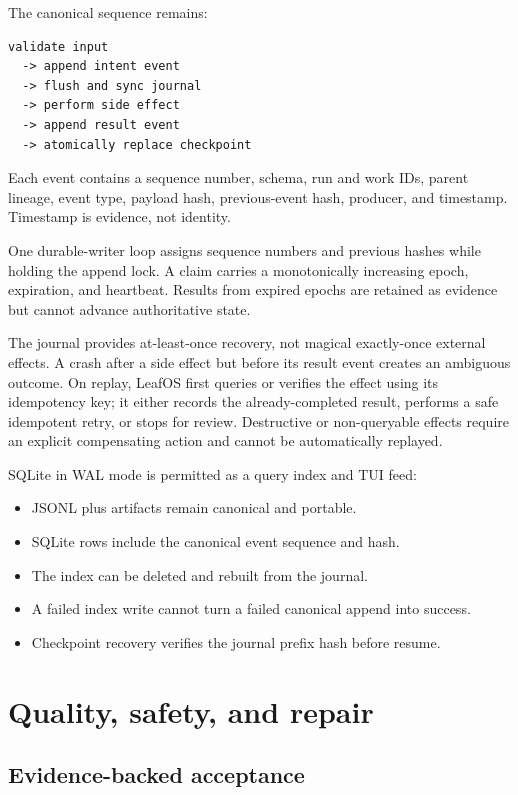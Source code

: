 \documentclass[11pt,letterpaper]{article}
\begin{document}
The canonical sequence remains:

\begin{lstlisting}
validate input
  -> append intent event
  -> flush and sync journal
  -> perform side effect
  -> append result event
  -> atomically replace checkpoint
\end{lstlisting}

Each event contains a sequence number, schema, run and work IDs, parent lineage,
event type, payload hash, previous-event hash, producer, and timestamp.
Timestamp is evidence, not identity.

One durable-writer loop assigns sequence numbers and previous hashes while
holding the append lock. A claim carries a monotonically increasing epoch,
expiration, and heartbeat. Results from expired epochs are retained as evidence
but cannot advance authoritative state.

The journal provides at-least-once recovery, not magical exactly-once external
effects. A crash after a side effect but before its result event creates an
ambiguous outcome. On replay, LeafOS first queries or verifies the effect using
its idempotency key; it either records the already-completed result, performs a
safe idempotent retry, or stops for review. Destructive or non-queryable effects
require an explicit compensating action and cannot be automatically replayed.

SQLite in WAL mode is permitted as a query index and TUI feed:

\begin{itemize}
  \item JSONL plus artifacts remain canonical and portable.
  \item SQLite rows include the canonical event sequence and hash.
  \item The index can be deleted and rebuilt from the journal.
  \item A failed index write cannot turn a failed canonical append into success.
  \item Checkpoint recovery verifies the journal prefix hash before resume.
\end{itemize}

\section{Quality, safety, and repair}

\subsection{Evidence-backed acceptance}
\end{document}
